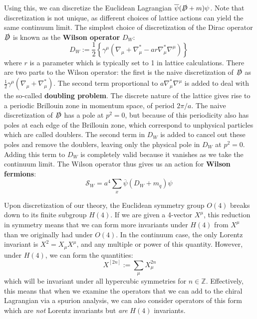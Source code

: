 \documentclass[11pt, oneside]{article}   	%
\theoremstyle{definition}
\begin{document}
Using this, we can discretize the Euclidean Lagrangian $\overline\psi(\slashed D + m)\psi$. Note that discretization is not 
unique, as different choices of lattice actions can yield the same continuum limit. The simplest choice of discretization of 
the Dirac operator $\slashed D$ is known as the \textbf{Wilson operator} $D_W$:
\begin{equation}
	D_W := \frac{1}{2}\left\{\gamma^\mu (\nabla_\mu + \nabla_\mu^* - a r \nabla_\mu^*\nabla^\mu)\right\}~
	\label{eq:D_wilson}
\end{equation}
where $r$ is a parameter which is typically set to 1 in lattice calculations. There are two parts to the Wilson operator: the 
first is the naive discretization of $\slashed D$ as $\frac{1}{2}\gamma^\mu(\nabla_\mu + \nabla_\mu^*)$. The second 
term proportional to $a\nabla_\mu^*\nabla^\mu$ is added to deal with the so-called \textbf{doubling problem}. The discrete 
nature of the lattice gives rise to a periodic Brillouin zone in momentum space, of period $2\pi / a$. The naive discretization 
of $\slashed D$ has a pole at $p^2 = 0$, but because of this periodicity also has poles at each edge of the Brillouin zone, 
which correspond to unphysical particles which are called doublers. The second term in $D_W$ is added to cancel out 
these poles and remove the doublers, leaving only the physical pole in $D_W$ at $p^2 = 0$. Adding this term to 
$D_W$ is completely valid because it vanishes as we take the continuum limit. The Wilson operator thus gives us an 
action for \textbf{Wilson fermions}:
\begin{equation}
	\mathcal S_W = a^4\sum_x \overline\psi(D_W + m_q)\psi~
	\label{eq:wilson_fermions}
\end{equation}

Upon discretization of our theory, the Euclidean symmetry group $O(4)$ breaks down to its finite subgroup $H(4)$. If we are 
given a 4-vector $X^\mu$, this reduction in symmetry means that we can form more invariants under $H(4)$ from $X^\mu$ 
than we originally had under $O(4)$. In the continuum case, the only Lorentz invariant is $X^2 = X_\mu X^\mu$, and any 
multiple or power of this quantity. However, under $H(4)$, we can form the quantities:
\begin{equation}
	X^{[2n]} := \sum_\mu X_\mu^{2n}
\end{equation}
which will be invariant under all hypercubic symmetries for $n\in\mathbb Z$. Effectively, this means that when we examine 
the operators that we can add to the chiral Lagrangian via a spurion analysis, we can also consider operators of this form 
which are \textit{not} Lorentz invariants but \textit{are} $H(4)$ invariants. 
\end{document}
